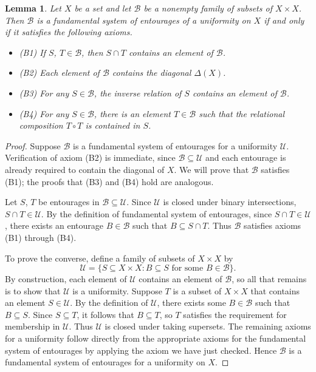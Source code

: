 \documentclass[12pt]{article}
\newcommand{\UU}{\mathcal{U}}
\newcommand{\BB}{\mathcal{B}}
\newtheorem*{lemma*}{Lemma}
\begin{document}

\begin{lemma*}
Let $X$ be a set and let $\BB$ be a nonempty family of subsets of $X\times X$.  Then $\BB$ is a fundamental system of entourages of a uniformity on $X$ if and only if it satisfies the following axioms.
\begin{itemize}
\item
(B1) If $S$, $T\in\BB$, then $S\cap T$ contains an element of $\BB$.

\item
(B2) Each element of $\BB$ contains the diagonal $\Delta(X)$.

\item
(B3) For any $S\in\BB$, the inverse relation of $S$ contains an element of $\BB$.

\item
(B4) For any $S\in\BB$, there is an element $T\in\BB$ such that the relational composition $T\circ T$ is contained in $S$.
\end{itemize}
\end{lemma*}

\begin{proof}
Suppose $\BB$ is a fundamental system of entourages for a uniformity $\UU$.  Verification of axiom (B2) is immediate, since $\BB\subseteq\UU$ and each entourage is already required to contain the diagonal of $X$.  We will prove that $\BB$ satisfies (B1); the proofs that (B3) and (B4) hold are analogous.

Let $S$, $T$ be entourages in $\BB\subseteq\UU$.  Since $\UU$ is closed under binary intersections, $S\cap T\in\UU$.  By the definition of fundamental system of entourages, since $S\cap T\in\UU$, there exists an entourage $B\in\BB$ such that $B\subseteq S\cap T$.  Thus $\BB$ satisfies axioms (B1) through (B4).

To prove the converse, define a family of subsets of $X\times X$ by
\[
\UU = \{ S \subseteq X\times X \colon B\subseteq S \text{\ for some $B\in\BB$} \}.
\]
By construction, each element of $\UU$ contains an element of $\BB$, so all that remains is to show that $\UU$ is a uniformity.  Suppose $T$ is a subset of $X\times X$ that contains an element $S\in\UU$.  By the definition of $\UU$, there exists some $B\in\BB$ such that $B\subseteq S$.  Since $S\subseteq T$, it follows that $B\subseteq T$, so $T$ satisfies the requirement for membership in $\UU$.  Thus $\UU$ is closed under taking supersets.  The remaining axioms for a uniformity follow directly from the appropriate axioms for the fundamental system of entourages by applying the axiom we have just checked.  Hence $\BB$ is a fundamental system of entourages for a uniformity on $X$.
\end{proof}
\end{document}
